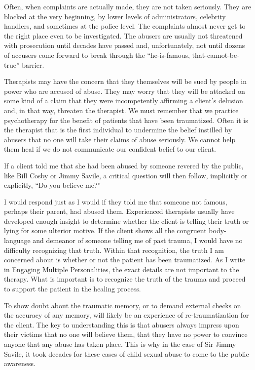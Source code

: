 \documentclass[]{book}
\begin{document}
Often, when complaints are actually made, they are not taken seriously. They are blocked at the very beginning, by lower levels of administrators, celebrity handlers, and sometimes at the police level. The complaints almost never get to the right place even to be investigated. The abusers are usually not threatened with prosecution until decades have passed and, unfortunately, not until dozens of accusers come forward to break through the ``he-is-famous, that-cannot-be-true'' barrier.

Therapists may have the concern that they themselves will be sued by people in power who are accused of abuse. They may worry that they will be attacked on some kind of a claim that they were incompetently affirming a client's delusion and, in that way, threaten the therapist. We must remember that we practice psychotherapy for the benefit of patients that have been traumatized. Often it is the therapist that is the first individual to undermine the belief instilled by abusers that no one will take their claims of abuse seriously. We cannot help them heal if we do not communicate our confident belief to our client.

If a client told me that she had been abused by someone revered by the public, like Bill Cosby or Jimmy Savile, a critical question will then follow, implicitly or explicitly, ``Do you believe me?''

I would respond just as I would if they told me that someone not famous, perhaps their parent, had abused them. Experienced therapists usually have developed enough insight to determine whether the client is telling their truth or lying for some ulterior motive. If the client shows all the congruent body-language and demeanor of someone telling me of past trauma, I would have no difficulty recognizing that truth. Within that recognition, the truth I am concerned about is whether or not the patient has been traumatized. As I write in Engaging Multiple Personalities, the exact details are not important to the therapy. What is important is to recognize the truth of the trauma and proceed to support the patient in the healing process.

To show doubt about the traumatic memory, or to demand external checks on the accuracy of any memory, will likely be an experience of re-traumatization for the client. The key to understanding this is that abusers always impress upon their victims that no one will believe them, that they have no power to convince anyone that any abuse has taken place. This is why in the case of Sir Jimmy Savile, it took decades for these cases of child sexual abuse to come to the public awareness.
\end{document}
